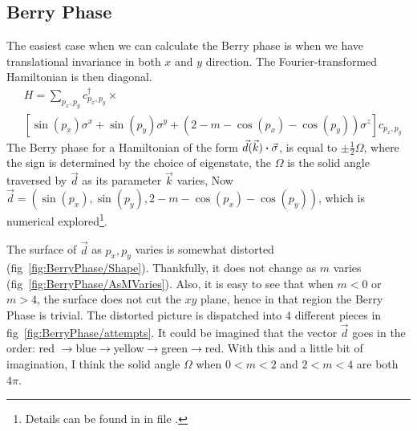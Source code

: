 \documentclass{article}
\begin{document}
    \subsection{Berry Phase}
    \label{sec:Berry Phase}
    The easiest case when we can calculate the Berry phase is when we have
    translational invariance in both $x$ and $y$ direction. The
    Fourier-transformed Hamiltonian is then diagonal. 
    \begin{align}
        &H =\sum_{p_x,p_y} c^\dagger_{p_x,p_y}\times
        \nonumber\\
        &\left[ \sin(p_x)\sigma^x + \sin(p_y)\sigma^y
            +(2-m-\cos(p_x)-\cos(p_y))\sigma^z
        \right] c_{p_x,p_y}
    \end{align}
    The Berry phase for a Hamiltonian of the form
    $\vec{d}(\vec{k})\vdot\vec{\sigma}$, is equal to $\pm\frac{1}{2}\Omega$,
    where the sign is determined by the choice of eigenstate, the $\Omega$ is
    the solid angle traversed by $\vec{d}$ as its parameter $\vec{k}$ varies,
    Now $\vec{d}=(\sin(p_x),\sin(p_y),2-m-\cos(p_x)-\cos(p_y))$, which is
    numerical explored\footnote{Details can be found in in file .}.

    The surface of $\vec{d}$ as $p_x,p_y$ varies is somewhat distorted
    (fig~\ref{fig:BerryPhase/Shape}). Thankfully, it does not change as $m$
    varies (fig~\ref{fig:BerryPhase/AsMVaries}). Also, it is easy to see that
    when $m<0$ or $m>4$, the surface does not cut the $xy$ plane, hence in that
    region the Berry Phase is trivial. The distorted picture is dispatched into
    4 different pieces in fig~\ref{fig:BerryPhase/attempts}. It could be
    imagined that the vector $\vec{d}$ goes in the order: red
    $\to$blue$\to$yellow$\to$green$\to$red. With this and a little bit of
    imagination, I think the solid angle $\Omega$ when $0<m<2$ and $2<m<4$ are
    both $4\pi$.
\end{document}
